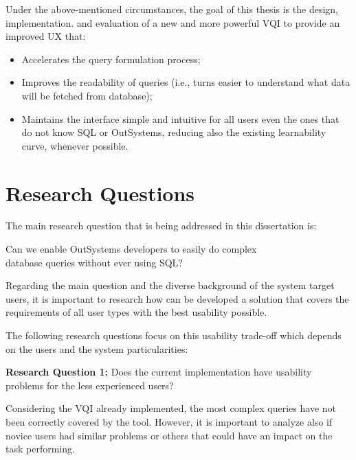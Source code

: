 Under the above-mentioned circumstances, the goal of this thesis is the design, implementation. and evaluation of a new and more powerful \gls{VQI} to provide an improved \gls{UX} that: 

\begin{itemize}
  \item Accelerates the query formulation process;
  \item Improves the readability of queries (i.e., turns easier to understand what data will be fetched from database);
  \item Maintains the interface simple and intuitive for all users even the ones that do not know SQL or OutSystems, reducing also the existing learnability curve, whenever possible.
\end{itemize}


\section{Research Questions}
\label{sec:research_questions}
The main research question that is being addressed in this dissertation is: 

\begin{center}
  Can we enable OutSystems developers to easily do complex \\ database queries without ever using \gls{SQL}?
\end{center}

Regarding the main question and the diverse background of the system target users, it is important to research how can be developed a solution that covers the requirements of all user types with the best usability possible.

The following research questions focus on this usability trade-off which depends on the users and the system particularities:

\medskip

\textbf{Research Question 1:} Does the current implementation have usability problems for the less experienced users?

\medskip

Considering the \gls{VQI} already implemented, the most complex queries have not been correctly covered by the tool. However, it is important to analyze also if novice users had similar problems or others that could have an impact on the task performing.

